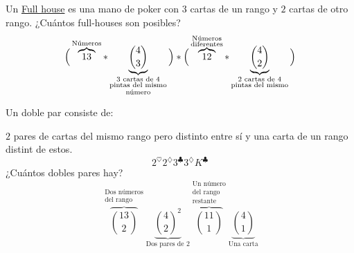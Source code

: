 \documentclass[../main.tex]{subfiles}
\begin{document}
Un \underline{Full house} es una mano de poker con $3$ cartas de un rango y $2$
cartas de otro rango.
¿Cuántos full-houses son posibles?
\[
	\Big{(}
	\overbrace{13}^{\text{Números}}
	*
	\underbrace{ \binom{4}{3} }_{\substack{\text{$3$ cartas de $4$}\\ \text{pintas del mismo}\\
	\text{número}} }
	\Big{)}
	*
	\Big{(}
	\overbrace{12}^{\substack{\text{Números}\\\text{diferentes}} }
	*
	\underbrace{ \binom{4}{2} }_{\substack{\text{$2$ cartas de $4$}\\ \text{pintas del mismo}} }
	\Big{)}
\]

Un doble par consiste de:

$2$ pares de cartas del mismo rango pero distinto entre sí y una carta de un rango
distint de estos.
\[
	2^\heartsuit2^\diamondsuit3^\clubsuit3^\diamondsuit K^\clubsuit
\]
¿Cuántos dobles pares hay?
\[
	\overbrace{ \binom{13}{2} }^{\substack{\text{Dos números}\\\text{del rango}} }
	\underbrace{ \binom{4}{2}^2 }_{\text{Dos pares de 2}}
	\overbrace{ \binom{11}{1} }^{\substack{\text{Un número}\\\text{del rango}\\\text{restante}} }
	\underbrace{ \binom{4}{1} }_{\text{Una carta}}
\]
\end{document}
